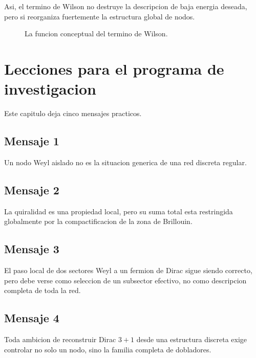 Asi, el termino de Wilson no destruye la descripcion de baja energia deseada, pero si reorganiza fuertemente la estructura global de nodos.

\begin{figure}[h!]
\centering
{}
\caption{La funcion conceptual del termino de Wilson.}
\end{figure}

\section{Lecciones para el programa de investigacion}
Este capitulo deja cinco mensajes practicos.

\subsection*{Mensaje 1}
Un nodo Weyl aislado no es la situacion generica de una red discreta regular.

\subsection*{Mensaje 2}
La quiralidad es una propiedad local, pero su suma total esta restringida globalmente por la compactificacion de la zona de Brillouin.

\subsection*{Mensaje 3}
El paso local de dos sectores Weyl a un fermion de Dirac sigue siendo correcto, pero debe verse como seleccion de un subsector efectivo, no como descripcion completa de toda la red.

\subsection*{Mensaje 4}
Toda ambicion de reconstruir Dirac \(3+1\) desde una estructura discreta exige controlar no solo un nodo, sino la familia completa de dobladores.

